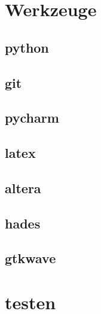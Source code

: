 \section{Werkzeuge}
\subsection{python}
\subsection{git}
\subsection{pycharm}
\subsection{latex}
\subsection{altera}
\subsection{hades}
\subsection{gtkwave}
\section{testen}

